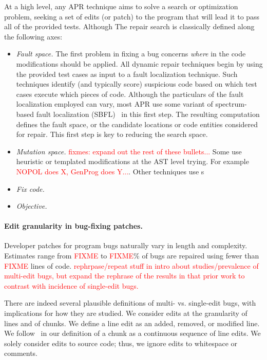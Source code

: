 \documentclass[sigconf, timestamp-false, anonymous=true]{acmart}
\newcommand\todo[1]{\textcolor{red}{#1}}
\begin{document}
At a high level, any APR technique aims to solve a search or optimization
problem, seeking a set of edits (or patch) to the program that will lead it to
pass all of the provided tests.  Although The repair search is classically defined along
the following axes:
\begin{itemize}
\item \emph{Fault space.} The first problem in fixing a bug concerns
  \emph{where} in the code modifications should be applied. All dynamic repair
  techniques begin by using the provided test cases as input to a fault
  localization technique. Such techniques identify (and typically score)
  suspicious code based on which test cases execute which pieces of code.
  Although the particulars of the fault localization employed can vary, most APR
  use some variant of spectrum-based fault localization (SBFL)~\cite{refs} in
  this first step. The resulting computation defines the fault space, or the
  candidate locations or code entities considered for repair. This first step is
  key to reducing the search space.
\item \emph{Mutation space.} \todo{fixmes: expand out the rest of these bullets...}
Some use heuristic or templated modifications at the AST level trying. For
example \todo{NOPOL does X, GenProg does Y...}. Other techniques use s

\item \emph{Fix code.}

\item \emph{Objective.} 

\end{itemize}



\paragraph{Edit granularity in bug-fixing patches.}  Developer patches for
program bugs naturally vary in length and complexity.  Estimates range from
\todo{FIXME} to \todo{FIXME}\% of bugs are repaired using fewer than
\todo{FIXME} lines of code.  \todo{rephrpase/repeat stuff in intro about
  studies/prevalence of multi-edit bugs, but expand the rephrase of the results
  in that prior work to contrast with incidence of single-edit bugs.}  

There are indeed several plausible definitions of multi- vs. single-edit bugs,
with implications for how they are studied.  We consider edits at the granularity 
of lines and of chunks. We define a line edit as an added, removed, or modified 
line. We follow~\cite{d4j-dissection} in our definition of a chunk as a continuous 
sequence of line edits. We solely consider edits to source code; thus, we ignore 
edits to whitespace or comments.
\end{document}
